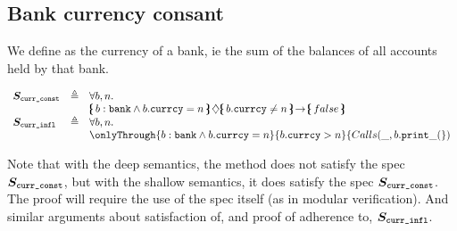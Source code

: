  \subsection{Bank currency consant}
 
 We define as  the currency of a bank, ie the sum of the balances of all accounts held by that bank.
 
 $\begin{array}{lll}
 \Spec{curr\_const} & \triangleq &  \forall b,n.\\
 & &   \onlyIf{b:\prg{bank}\wedge b.\prg{currcy}=n}{b.\prg{currcy}\neq n} {false}\   
 \\
  \Spec{curr\_infl} & \triangleq &  \forall b,n.\\
 & &   \onlyThrough{b:\prg{bank}\wedge b.\prg{currcy}=n}{b.\prg{currcy}> n} {\calls{\_}{b}{\prg{print}{\_}}}   
\end{array}
$
 
 Note that with the deep semantics, the method   does not satisfy the spec $ \boldmath{S}_{{\texttt{curr\_const}}}$, but with the shallow semantics, it does satisfy the spec $ \boldmath{S}_{{\texttt{curr\_const}}}$. The proof will require the use of the spec itself (as in modular verification). And similar arguments about satisfaction of,  and proof of  adherence to, $\boldmath{S}_{{\texttt{curr\_infl}}}$.
 